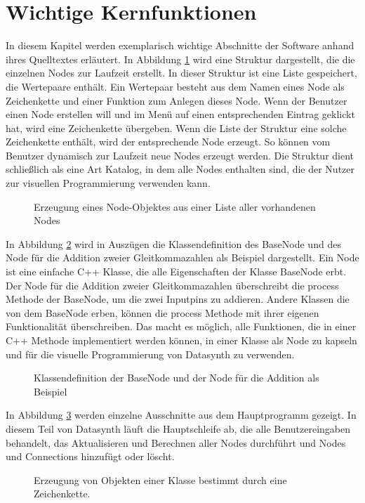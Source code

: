 \documentclass[a4paper, 
               12pt,
               DIV=calc,
               version=first,
               pdftex,
               headsepline,
               footsepline,
               bibtotocnumbered,
               liststotocnumbered]{scrreprt}
\begin{document}
\section{Wichtige Kernfunktionen}
\label{sec:Kernfunktionen}
In diesem Kapitel werden exemplarisch wichtige Abschnitte der Software anhand ihres Quelltextes
erläutert.
In Abbildung \ref{fig:factory} wird eine Struktur dargestellt, die die einzelnen
Nodes zur Laufzeit erstellt. In dieser Struktur ist eine Liste gespeichert, die Wertepaare
enthält. Ein Wertepaar besteht aus dem Namen eines Node als Zeichenkette und einer Funktion
zum Anlegen dieses Node.
Wenn der Benutzer einen Node erstellen will und im Menü auf einen entsprechenden Eintrag geklickt hat,
wird eine Zeichenkette übergeben. Wenn die Liste der Struktur eine solche Zeichenkette enthält, wird der
entsprechende Node erzeugt. So können vom Benutzer dynamisch zur Laufzeit
neue Nodes erzeugt werden. Die Struktur dient schließlich als eine Art Katalog, in dem alle
Nodes enthalten sind, die der Nutzer zur visuellen Programmierung verwenden kann.
\begin{figure}
\centering

\caption{Erzeugung eines Node-Objektes aus einer Liste aller vorhandenen Nodes}
\label{fig:factory}
\end{figure}
In Abbildung \ref{fig:node} wird in Auszügen die Klassendefinition des BaseNode und
des Node für die Addition zweier Gleitkommazahlen als Beispiel dargestellt.
Ein Node ist eine einfache C++ Klasse, die alle Eigenschaften der Klasse BaseNode erbt.
Der Node für die Addition zweier Gleitkommazahlen überschreibt die process Methode der BaseNode, um die zwei
Inputpins zu addieren. Andere Klassen die von dem BaseNode erben, können die process
Methode mit ihrer eigenen Funktionalität überschreiben.
Das macht es möglich, alle Funktionen, die in einer C++ Methode implementiert werden können,
in einer Klasse als Node zu kapseln und für die visuelle Programmierung von Datasynth zu verwenden.
\begin{figure}
\centering

\caption{Klassendefinition der BaseNode und der Node für die Addition als Beispiel}
\label{fig:node}
\end{figure}
In Abbildung \ref{fig:core} werden einzelne Ausschnitte aus dem Hauptprogramm gezeigt.
In diesem Teil von Datasynth läuft die Hauptschleife ab, die alle Benutzereingaben behandelt,
das Aktualisieren und Berechnen aller Nodes durchführt und Nodes und Connections
hinzufügt oder löscht.
\begin{figure}
\centering

\caption{Erzeugung von Objekten einer Klasse bestimmt durch eine Zeichenkette.}
\label{fig:core}
\end{figure}
\end{document}
